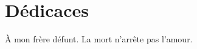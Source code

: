 \chapter*{D\'edicaces}
\vfill
\begin{center}
\`A mon frère défunt. La mort n’arrête pas l’amour.\\
\vspace{1.5cm}
\end{center}
\vfill
